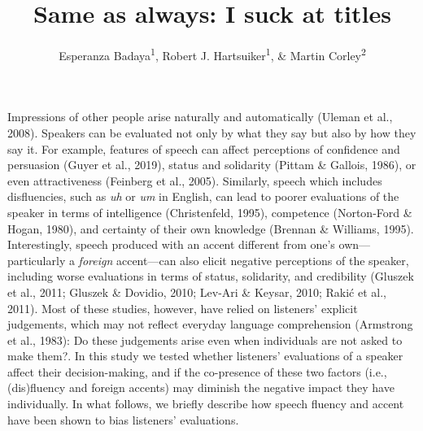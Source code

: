 \documentclass[
  man,floatsintext]{apa7}
\title{Same as always: I suck at titles}
\author{Esperanza Badaya\textsuperscript{1}, Robert J. Hartsuiker\textsuperscript{1}, \& Martin Corley\textsuperscript{2}}
\date{}
\affiliation{\vspace{0.5cm}\textsuperscript{1} Ghent University\\\textsuperscript{2} University of Edinburgh}
\begin{document}
\maketitle

Impressions of other people arise naturally and automatically (Uleman et al., 2008). Speakers can be evaluated not only by what they say but also by how they say it. For example, features of speech can affect perceptions of confidence and persuasion (Guyer et al., 2019), status and solidarity (Pittam \& Gallois, 1986), or even attractiveness (Feinberg et al., 2005). Similarly, speech which includes disfluencies, such as \emph{uh} or \emph{um} in English, can lead to poorer evaluations of the speaker in terms of intelligence (Christenfeld, 1995), competence (Norton-Ford \& Hogan, 1980), and certainty of their own knowledge (Brennan \& Williams, 1995). Interestingly, speech produced with an accent different from one's own---particularly a \emph{foreign} accent---can also elicit negative perceptions of the speaker, including worse evaluations in terms of status, solidarity, and credibility (Gluszek et al., 2011; Gluszek \& Dovidio, 2010; Lev-Ari \& Keysar, 2010; Rakić et al., 2011). Most of these studies, however, have relied on listeners' explicit judgements, which may not reflect everyday language comprehension (Armstrong et al., 1983): Do these judgements arise even when individuals are not asked to make them?. In this study we tested whether listeners' evaluations of a speaker affect their decision-making, and if the co-presence of these two factors (i.e., (dis)fluency and foreign accents) may diminish the negative impact they have individually. In what follows, we briefly describe how speech fluency and accent have been shown to bias listeners' evaluations.
\end{document}

